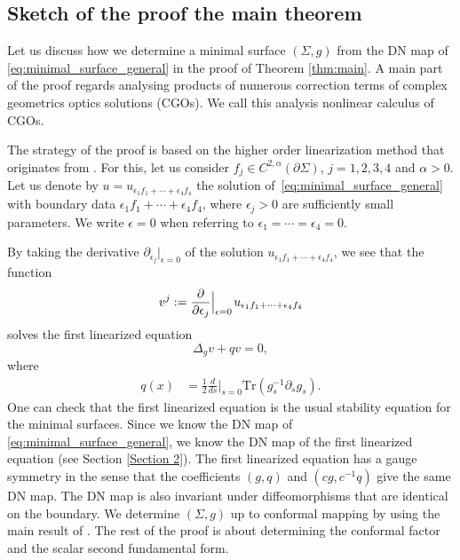 \documentclass[12pt]{amsart}
\def\p{\partial}
\theoremstyle{definition}
\theoremstyle{remark}
\newcommand{\abs}[1]{\lvert #1 \rvert}
\newcommand{\eps}{\epsilon}
\newcommand{\s}{\hspace{0.5pt}}
\begin{document}
\subsection{Sketch of the proof the main theorem}
Let us discuss how we determine a minimal surface $(\Sigma,g)$ from the DN map of \eqref{eq:minimal_surface_general} in the proof of Theorem \ref{thm:main}. A main part of the proof regards analysing products of numerous correction terms of complex geometrics optics solutions (CGOs). We call this analysis nonlinear calculus of CGOs. %

The strategy of the proof is based on the higher order linearization method that originates from \cite{kurylev2018inverse}. For this, let us consider $f_j\in C^{2,\alpha}(\p \Sigma)$, $j=1,2,3,4$ and $\alpha>0$. Let us denote by $u=u_{\eps_1f_1+ \cdots + \eps_4f_4}$ the solution of~\eqref{eq:minimal_surface_general} with boundary data $\eps_1f_1+ \cdots +\eps_4f_4$, where $\eps_j>0$ are sufficiently small parameters. We  write $\eps=0$ when referring to $\eps_1 = \cdots= \eps_4=0$. 

By taking the derivative $\p_{\eps_j}|_{\eps=0}$ of the solution $u_{\eps_1f_1+ \cdots + \eps_4f_4}$,  
we see that the function
\[
 v^j:=\frac{\p}{\p \eps_j}\Big|_{\eps=0}\s\s u_{\eps_1f_1+ \cdots + \eps_4f_4}
\]
solves the first linearized equation
\[
 \Delta_gv+qv=0,
\]
where 
\begin{align*}
 q(x)&=\frac{1}{2}\frac{d}{d s}\Big|_{s=0}\text{Tr}(g_s^{-1}\p_sg_s).%
\end{align*}
One can check that the first linearized equation is the usual stability equation \cite{colding2011course} for the minimal surfaces.  
Since we know the DN map of \eqref{eq:minimal_surface_general}, we know the DN map of the first linearized equation (see Section \ref{Section 2}). The first linearized equation has a gauge symmetry in the sense that the coefficients $(g,q)$ and $(cg,c^{-1}q)$ give the same DN map. The DN map is also invariant under diffeomorphisms that are identical on the boundary. We determine $(\Sigma, g)$ up to conformal mapping by using the main result of \cite{imanuvilov2012partial}.  The rest of the proof is about determining the conformal factor and the scalar second fundamental form.
\end{document}

